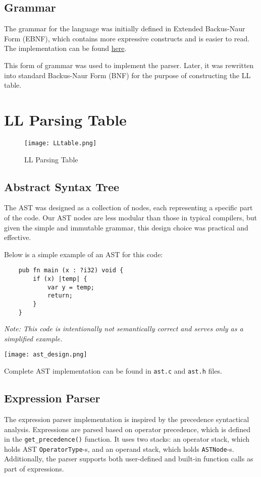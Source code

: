 \documentclass[12pt,a4paper]{article}
\begin{document}
\subsection{Grammar}
The grammar for the language was initially defined in Extended Backus-Naur Form (EBNF), which contains more expressive constructs and is easier to read. The implementation can be found 
\href{https://github.com/rm-a0/ifj-compiler/blob/main/doc/grammar\_edited.go}{here}.

This form of grammar was used to implement the parser. Later, it was rewritten into standard Backus-Naur Form (BNF) for the purpose of constructing the LL table.

\newpage
\section*{LL Parsing Table}

\begin{figure}[ht]
    \centering
    \texttt{[image: LLtable.png]} %
    \caption{LL Parsing Table}
    \label{fig:ll_table}
\end{figure}

\subsection{Abstract Syntax Tree}
The AST was designed as a collection of nodes, each representing a specific part of the code. Our AST nodes are less modular than those in typical compilers, but given the simple and immutable grammar, this design choice was practical and effective.

Below is a simple example of an AST for this code:
\begin{verbatim}
    pub fn main (x : ?i32) void {
        if (x) |temp| {
            var y = temp;
            return;
        }
    } 
\end{verbatim}
\textit{Note: This code is intentionally not semantically correct and serves only as a simplified example.}

\begin{center}
    \texttt{[image: ast\_design.png]}
\end{center}

Complete AST implementation can be found in \texttt{ast.c} and \texttt{ast.h} files.

\subsection{Expression Parser}
The expression parser implementation is inspired by the precedence syntactical analysis. Expressions are parsed based on operator precedence, which is defined in the \texttt{get\_precedence()} function. It uses two stacks: an operator stack, which holds AST \texttt{OperatorType}-s, and an operand stack, which holds \texttt{ASTNode}-s. Additionally, the parser supports both user-defined and built-in function calls as part of expressions.
\end{document}
